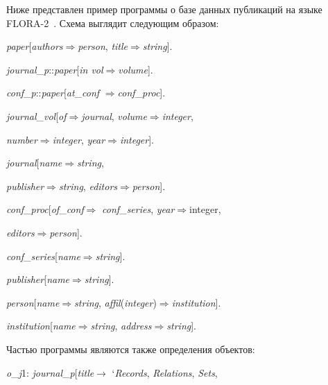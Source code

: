 \begin{multicols}{2}
Ниже представлен пример программы о базе данных публикаций на языке 
FLORA-2~\cite{37kal}. Схема выглядит следующим образом:

\smallskip



\noindent
\textit{paper}[\textit{authors}\;$\Rightarrow$\;\textit{person}, 
\textit{title}\;$\Rightarrow$\;\textit{string}].

\noindent
\textit{journal}\_\textit{p}\;::\;\textit{paper}[\textit{in vol}\;$\Rightarrow$\;\textit{volume}].

\noindent
\textit{conf}\_\textit{p}\;::\;\textit{paper}[\textit{at}\_\textit{conf}\;
$\Rightarrow$\;\textit{conf}\_\textit{proc}].

\noindent
\textit{journal}\_\textit{vol}[\textit{of}\;$\Rightarrow$\;\textit{journal}, 
\textit{volume}\;$\Rightarrow$\;\textit{integer}, 

\textit{number}\;$\Rightarrow$\;\textit{integer}, 
\textit{year}\;$\Rightarrow$\;\textit{integer}].

\noindent
\textit{journal}[\textit{name}\;$\Rightarrow$\;\textit{string}, 

\textit{publisher}\;$\Rightarrow$\;\textit{string}, \textit{editors}\;$\Rightarrow$\;\textit{person}].

\noindent
\textit{conf}\_\textit{proc}[\textit{of}\_\textit{conf}\;$\Rightarrow$\;
\textit{conf}\_\textit{series}, \textit{year}\;$\Rightarrow$\;integer,

\textit{editors}\;$\Rightarrow$\;\textit{person}].

\noindent
\textit{conf}\_\textit{series}[\textit{name}\;$\Rightarrow$\;\textit{string}].

\noindent
\textit{publisher}[\textit{name}\;$\Rightarrow$\;\textit{string}].

\noindent
\textit{person}[\textit{name}\;$\Rightarrow$\;\textit{string}, 
\textit{affil}(\textit{integer})\;$\Rightarrow$\;\textit{institution}].

\noindent
\textit{institution}[\textit{name}\;$\Rightarrow$\;\textit{string}, \textit{address}\;$\Rightarrow$\;\textit{string}].


\smallskip

\noindent
Частью программы являются также определения объектов:

\smallskip

\noindent
\textit{o}\_\textit{j}1: \textit{journal}\_\textit{p}[\textit{title}\;$\rightarrow$\;
`\textit{Records}, \textit{Relations}, \textit{Sets},


\end{multicols}
